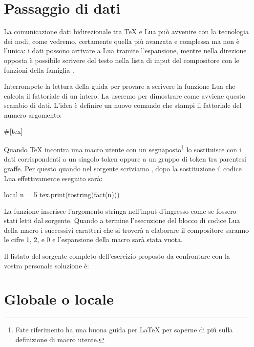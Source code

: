\section{Passaggio di dati}
\label{iSecPassaggioDati}

La comunicazione dati bidirezionale tra \TeX{} e Lua può avvenire con la
tecnologia dei nodi, come vedremo, certamente quella più avanzata e complessa
ma non è l'unica: i dati possono arrivare a Lua tramite l'espansione, mentre
nella direzione opposta è possibile scrivere del testo nella lista di input
del compositore con le funzioni della famiglia .

Interrompete la lettura della guida per provare a scrivere la funzione Lua
 che calcola il fattoriale di un intero. La useremo per dimostrare come
avviene questo scambio di dati. L'idea è definire un nuovo comando che stampi il
fattoriale del numero argomento:
\begin{lines}
#[tex]
\newcommand{\fattoriale}[1]{\directlua{
    local n = #1
    tex.print(tostring(fact(n)))
}}
\end{lines}

Quando \TeX{} incontra una macro utente con un segnaposto\footnote{Fate
riferimento ha una buona guida per \LaTeX{} per saperne di più sulla definizione
di macro utente.} lo sostituisce con i dati corrispondenti a un singolo token
oppure a un gruppo di token tra parentesi graffe. Per questo quando nel sorgente
scriviamo , dopo la sostituzione il codice Lua
effettivamente eseguito sarà:
\begin{lines}
local n = 5
tex.print(tostring(fact(n)))
\end{lines}

La funzione  inserisce l'argomento stringa nell'input d'ingresso
come se fossero stati letti dal sorgente. Quando a termine l'esecuzione del
blocco di codice Lua della macro  i successivi caratteri che si
troverà a elaborare il compositore saranno le cifre 1, 2, e 0 e l'espansione
della macro sarà stata vuota.

Il listato del sorgente completo dell'esercizio proposto da confrontare con la
vostra personale soluzione è:


\section{Globale o locale}
\label{iSecGlobaleLocale}

